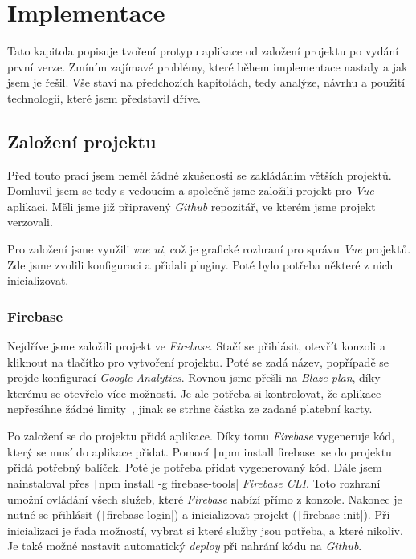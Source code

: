 
\chapter{Implementace}
Tato kapitola popisuje tvoření protypu aplikace od založení projektu po vydání první verze. Zmíním zajímavé problémy,
které během implementace nastaly a jak jsem je řešil. Vše staví na předchozích kapitolách, tedy analýze, návrhu a použití
technologií, které jsem představil dříve.

\section{Založení projektu}
Před touto prací jsem neměl žádné zkušenosti se zakládáním větších projektů. Domluvil jsem se tedy s vedoucím a společně
jsme založili projekt pro \emph{Vue} aplikaci. Měli jsme již připravený \emph{Github} repozitář, ve kterém jsme projekt
verzovali.

Pro založení jsme využili \emph{vue ui}, což je grafické rozhraní pro správu \emph{Vue} projektů. Zde jsme zvolili konfiguraci
a přidali pluginy. Poté bylo potřeba některé z nich inicializovat.

\subsection{Firebase}
Nejdříve jsme založili projekt ve \emph{Firebase}. Stačí se přihlásit, otevřít konzoli a kliknout na tlačítko pro vytvoření projektu.
Poté se zadá název, popřípadě se projde konfigurací \emph{Google Analytics}. Rovnou jsme přešli na \emph{Blaze plan}, díky kterému
se otevřelo více možností. Je ale potřeba si kontrolovat, že aplikace nepřesáhne žádné limity~\cite{FirebaseLimits}, jinak se strhne
částka ze zadané platební karty.

Po založení se do projektu přidá aplikace. Díky tomu \emph{Firebase} vygeneruje kód, který se musí do aplikace přidat.
Pomocí \texttt|npm install firebase| se do projektu přidá potřebný balíček. Poté je potřeba přidat vygenerovaný
kód. Dále jsem nainstaloval přes \texttt|npm install -g firebase-tools| \emph{Firebase CLI}. Toto rozhraní umožní
ovládání všech služeb, které \emph{Firebase} nabízí přímo z konzole. Nakonec je nutné se přihlásit (\texttt|firebase login|) a %
inicializovat projekt (\texttt|firebase init|). Při inicializaci je řada možností, vybrat si které služby jsou potřeba,
a které nikoliv. Je také možné nastavit automatický \emph{deploy} při nahrání kódu na \emph{Github}.

